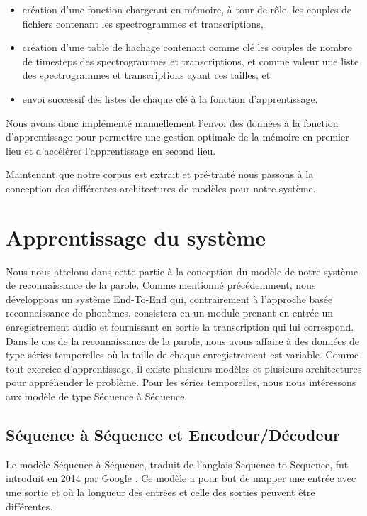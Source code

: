 \begin{itemize}
    \item création d'une fonction chargeant en mémoire, à tour de rôle, les couples de fichiers contenant les spectrogrammes et transcriptions,
    \item création d'une table de hachage contenant comme clé les couples de nombre de timesteps des spectrogrammes et transcriptions, et comme valeur une liste des spectrogrammes et transcriptions ayant ces tailles, et
    \item envoi successif des listes de chaque clé à la fonction d'apprentissage.
\end{itemize}

Nous avons donc implémenté manuellement l'envoi des données à la fonction d'apprentissage pour permettre une gestion optimale de la mémoire en premier lieu et d'accélérer l'apprentissage en second lieu.

Maintenant que notre corpus est extrait et pré-traité nous passons à la conception des différentes architectures de modèles pour notre système.


\section{Apprentissage du système}\label{apprentissage}
Nous nous attelons dans cette partie à la conception du modèle de notre système de reconnaissance de la parole. Comme mentionné précédemment, nous développons un système End-To-End qui, contrairement à l'approche basée reconnaissance de phonèmes, consistera en un module prenant en entrée un enregistrement audio et fournissant en sortie la transcription qui lui correspond. Dans le cas de la reconnaissance de la parole, nous avons affaire à des données de type séries temporelles où la taille de chaque enregistrement est variable. Comme tout exercice d'apprentissage, il existe plusieurs modèles et plusieurs architectures pour appréhender le problème. Pour les séries temporelles, nous nous intéressons aux modèle de type Séquence à Séquence.

\subsection{Séquence à Séquence et Encodeur/Décodeur}
Le modèle Séquence à Séquence, traduit de l'anglais Sequence to Sequence, fut introduit en 2014 par Google \cite{seq2seqgoogle}. Ce modèle a pour but de mapper une entrée avec une sortie et où la longueur des entrées et celle des sorties peuvent être différentes.

